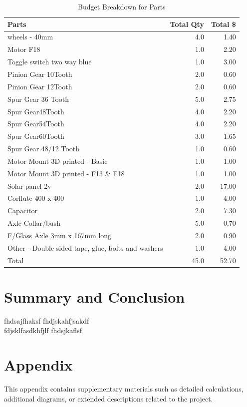 \documentclass[12pt]{article}
\begin{document}
\begin{table}[h] 
\centering 
\begin{tabularx}{\textwidth}{Xrr}
\toprule
Parts & Total Qty & Total \$ \\
\midrule
wheels - 40mm & 4.0 & 1.40 \\
Motor F18 & 1.0 & 2.20 \\
Toggle switch two way blue & 1.0 & 3.00 \\
Pinion Gear 10Tooth & 2.0 & 0.60 \\
Pinion Gear 12Tooth & 2.0 & 0.60 \\
Spur Gear 36 Tooth & 5.0 & 2.75 \\
Spur Gear48Tooth & 4.0 & 2.20 \\
Spur Gear54Tooth & 4.0 & 2.20 \\
Spur Gear60Tooth & 3.0 & 1.65 \\
Spur Gear 48/12 Tooth & 1.0 & 0.60 \\
Motor Mount 3D printed - Basic & 1.0 & 1.00 \\
Motor Mount 3D printed - F13 \& F18 & 1.0 & 1.00 \\
Solar panel 2v & 2.0 & 17.00 \\
Corflute 400 x 400 & 1.0 & 4.00 \\
Capacitor & 2.0 & 7.30 \\
Axle Collar/bush & 5.0 & 0.70 \\
F/Glass Axle 3mm x 167mm long & 2.0 & 0.90 \\
Other - Double sided tape, glue, bolts and washers & 1.0 & 4.00 \\
\midrule
Total & 45.0 & 52.70 \\
\bottomrule
\end{tabularx}
\caption{Budget Breakdown for Parts}
\end{table}
\section{Summary and Conclusion}
fhdsajfhaksf
fhdjskahfjsakdf
\\
fdjsklfasdkhfjlf
fhdsjkaflsf\\
\newpage
{}
\printbibliography

\newpage
\appendix
\section{Appendix}
This appendix contains supplementary materials such as detailed calculations, additional diagrams, or extended descriptions related to the project.
\end{document}

